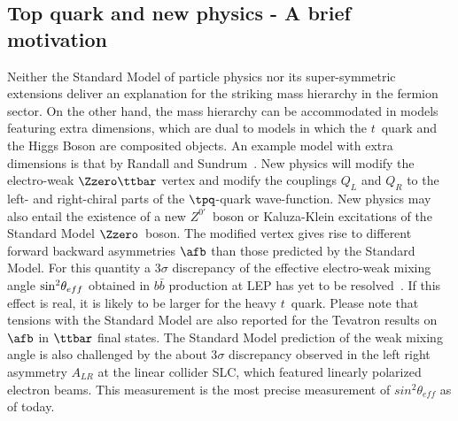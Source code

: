 \subsection{Top quark and new physics -  A brief motivation}

Neither the Standard Model of particle physics nor its super-symmetric extensions deliver an explanation for the striking mass hierarchy in the fermion sector. On the other hand, the mass hierarchy can be accommodated in models featuring extra dimensions, which are dual to models in which the $t$~quark and the Higgs Boson are composited objects. 
An example model with extra dimensions is that by Randall and Sundrum~\cite{Randall:1999ee}.  New physics will modify the electro-weak $\Zzero \ttbar$ vertex and modify the couplings $Q_L$ and $Q_R$ to the left- and right-chiral parts of the $\tpq$-quark wave-function. New physics may also entail the existence of a new $Z^{0'}$~boson or Kaluza-Klein excitations of the Standard Model $\Zzero$~boson. The modified vertex gives rise to different forward backward asymmetries $\afb$ than those predicted by the Standard Model. For this quantity a 3$\sigma$ discrepancy of the effective electro-weak mixing angle ${\rm sin}^{2}\theta_{eff}$ obtained in $b\bar{b}$ production at LEP has yet to be resolved~\cite{ALEPH:2005ab}. If this  effect is real, it is likely to be larger for the heavy $t$~quark.  
Please note that tensions with the Standard Model are also reported for the Tevatron results on $\afb$ in $\ttbar$ final states. 
The Standard Model prediction of the weak mixing angle is also challenged by the about  3$\sigma$ discrepancy observed in the
left right asymmetry $A_{LR}$ at the linear collider SLC, which featured linearly polarized electron beams. This measurement is the most precise measurement of $sin^{2}\theta_{eff}$ as of today. 

 


